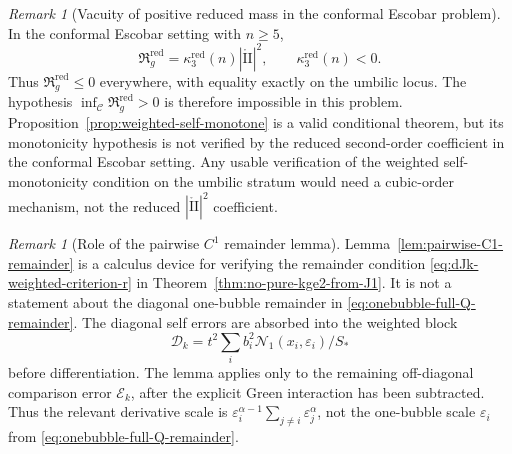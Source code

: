 \documentclass[11pt,reqno,a4paper]{amsart}
\numberwithin{equation}{section}
\theoremstyle{plain}
\theoremstyle{remark}
\newtheorem{remark}[theorem]{Remark}
\theoremstyle{plain}
\begin{document}
\begin{remark}[Vacuity of positive reduced mass in the conformal Escobar problem]
\label{rem:positive-Rred-vacuous}
In the conformal Escobar setting with $n\ge5$,
\[
\mathfrak R_g^{\mathrm{red}}
=\kappa_3^{\mathrm{red}}(n)|\mathring{\mathrm{II}}|^2,
\qquad
\kappa_3^{\mathrm{red}}(n)<0.
\]
Thus $\mathfrak R_g^{\mathrm{red}}\le0$ everywhere, with equality exactly
on the umbilic locus.  The hypothesis
$\inf_{\mathcal C}\mathfrak R_g^{\mathrm{red}}>0$ is therefore impossible in
this problem.  Proposition~\ref{prop:weighted-self-monotone} is a valid
conditional theorem, but its monotonicity hypothesis is not verified by the
reduced second-order coefficient in the conformal Escobar setting.
Any usable verification of the weighted self-monotonicity condition on the
umbilic stratum would need a cubic-order mechanism, not the reduced
$|\mathring{\mathrm{II}}|^2$ coefficient.
\end{remark}

\begin{remark}[Role of the pairwise $C^1$ remainder lemma]
\label{rem:pairwise-C1-remainder-role}
Lemma~\ref{lem:pairwise-C1-remainder} is a calculus device for verifying the remainder condition
\eqref{eq:dJk-weighted-criterion-r} in Theorem~\ref{thm:no-pure-kge2-from-J1}.  It is not a statement about the
diagonal one-bubble remainder in \eqref{eq:onebubble-full-Q-remainder}.  The diagonal self errors are absorbed
into the weighted block
\[
\mathcal D_k=t^2\sum_i b_i^2\mathcal N_1(x_i,\varepsilon_i)/S_\ast
\]
before differentiation.  The lemma applies only to the remaining off-diagonal comparison error
$\mathcal E_k$, after the explicit Green interaction has been subtracted.  Thus the relevant derivative scale
is $\varepsilon_i^{\alpha-1}\sum_{j\ne i}\varepsilon_j^\alpha$, not the one-bubble scale
$\varepsilon_i$ from \eqref{eq:onebubble-full-Q-remainder}.
\end{remark}
\end{document}
